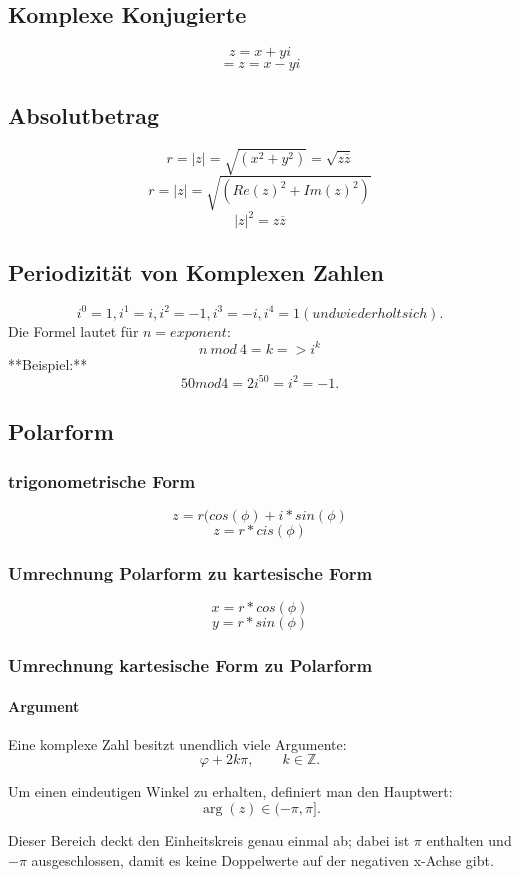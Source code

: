\documentclass[9pt,a4paper]{article}
\begin{document}
    \subsection{Komplexe Konjugierte}
    $$z=x+yi$$
    $$={z}=x-yi$$
    
    \subsection{Absolutbetrag}
    $$r=\vert z \vert=\sqrt{(x^2+y^2)}=\sqrt{z\overline{z}}$$
    $$r=\vert z \vert=\sqrt{(Re(z)^2+Im(z)^2)}$$
    $$|z|^2=z\overline{z}$$
    
    \subsection{Periodizität von Komplexen Zahlen}
    $$i^0=1,i^1=i,i^2=-1,i^3=-i,i^4=1 (und wiederholt sich).$$
    Die Formel lautet für $n=exponent$:
    $$n\ mod \ 4 = k => i^k$$
    **Beispiel:**
    $$50 mod 4=2i^{50}=i^2=-1.$$
    \subsection{Polarform}
    \subsubsection{trigonometrische Form}
    $$z=r(cos(\phi)+i*sin(\phi)$$
    $$z=r*cis(\phi)$$
    
    \subsubsection{Umrechnung Polarform zu kartesische Form}
    $$x = r*cos(\phi)$$
    $$y = r*sin(\phi)$$
    \subsubsection{Umrechnung kartesische Form zu Polarform}
    \paragraph{Argument}
    Eine komplexe Zahl besitzt unendlich viele Argumente:
    \[
    \varphi + 2k\pi,\qquad k\in\mathbb{Z}.
    \]
    
    Um einen eindeutigen Winkel zu erhalten, definiert man den Hauptwert:
    \[
    \arg(z)\in(-\pi,\pi].
    \]
    
    Dieser Bereich deckt den Einheitskreis genau einmal ab; dabei ist
    \(\pi\) enthalten und \(-\pi\) ausgeschlossen, damit es keine
    Doppelwerte auf der negativen x-Achse gibt.
    
\end{document}

